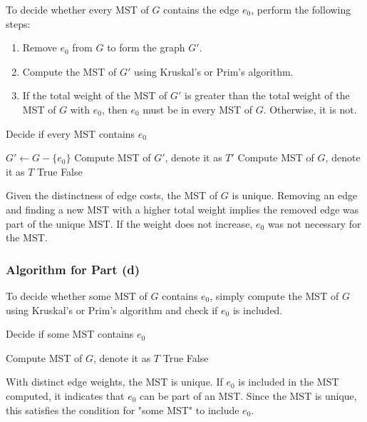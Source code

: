 \documentclass{article}
\begin{document}
To decide whether every MST of $G$ contains the edge $e_0$, perform the following steps:
\begin{enumerate}
    \item Remove $e_0$ from $G$ to form the graph $G'$.
    \item Compute the MST of $G'$ using Kruskal's or Prim's algorithm.
    \item If the total weight of the MST of $G'$ is greater than the total weight of the MST of $G$ with $e_0$, then $e_0$ must be in every MST of $G$. Otherwise, it is not.
\end{enumerate}
\begin{algorithm}
\caption{Decide if every MST contains $e_0$}
\begin{algorithmic}[1]
\State $G' \gets G - \{e_0\}$ 
\State Compute MST of $G'$, denote it as $T'$
\State Compute MST of $G$, denote it as $T$
    \State \Return True 
\Else
    \State \Return False 
\EndIf
\end{algorithmic}
\end{algorithm}
Given the distinctness of edge costs, the MST of $G$ is unique. Removing an edge and finding a new MST with a higher total weight implies the removed edge was part of the unique MST. If the weight does not increase, $e_0$ was not necessary for the MST.

\subsubsection{Algorithm for Part (d)}

To decide whether some MST of $G$ contains $e_0$, simply compute the MST of $G$ using Kruskal's or Prim's algorithm and check if $e_0$ is included.
\begin{algorithm}
\caption{Decide if some MST contains $e_0$}
\begin{algorithmic}[1]
\State Compute MST of $G$, denote it as $T$
    \State \Return True 
\Else
    \State \Return False 
\EndIf
\end{algorithmic}
\end{algorithm}
With distinct edge weights, the MST is unique. If $e_0$ is included in the MST computed, it indicates that $e_0$ can be part of an MST. Since the MST is unique, this satisfies the condition for "some MST" to include $e_0$.
\end{document}
